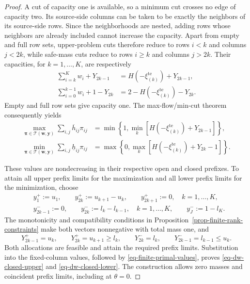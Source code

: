 \begin{proof}
  A cut of capacity one is available, so a minimum cut crosses no edge of capacity two. Its source-side columns can be taken to be exactly the neighbors of its source-side rows. Since the neighborhoods are nested, adding rows whose neighbors are already included cannot increase the capacity. Apart from empty and full row sets, upper-problem cuts therefore reduce to rows $i<k$ and columns $j<2k$, while safe-mass cuts reduce to rows $i\ge k$ and columns $j>2k$. Their capacities, for $k=1,\ldots,K$, are respectively
  \begin{align*}
    \sum_{i=k}^{K}w_i+Y_{2k-1}
      &=H\left(-\xi_{(k)}^{\mathrm{te}}\right)+Y_{2k-1},\\
    \sum_{i=0}^{k-1}w_i+1-Y_{2k}
      &=2-H\left(-\xi_{(k)}^{\mathrm{te}}\right)-Y_{2k}.
  \end{align*}
  Empty and full row sets give capacity one. The max-flow/min-cut theorem \citep{F.F56} consequently yields
  \begin{align*}
    \max_{\bm\pi\in\mathcal T(\bm w,\bm y)}\sum_{i,j}\overline h_{ij}\pi_{ij}
      &=\min\left\{1,\min_k\left[H\left(-\xi_{(k)}^{\mathrm{te}}\right)+Y_{2k-1}\right]\right\},\\
    \min_{\bm\pi\in\mathcal T(\bm w,\bm y)}\sum_{i,j}\underline h_{ij}\pi_{ij}
      &=\max\left\{0,\max_k\left[H\left(-\xi_{(k)}^{\mathrm{te}}\right)+Y_{2k}-1\right]\right\}.
  \end{align*}

  These values are nondecreasing in their respective open and closed prefixes. To attain all upper prefix limits for the maximization and all lower prefix limits for the minimization, choose
  \begin{align*}
    &y_1^+:=u_1,\qquad y_{2k}^+:=u_{k+1}-u_k,\qquad
      y_{2k+1}^+:=0,\quad k=1,\ldots,K,\\
    &y_{2k-1}^-:=0,\qquad y_{2k}^-:=l_k-l_{k-1},\quad k=1,\ldots,K,
      \qquad y_J^-:=1-l_K.
  \end{align*}
  The monotonicity and compatibility conditions in Proposition~\ref{prop-finite-rank-constraints} make both vectors nonnegative with total mass one, and
  \[
    Y_{2k-1}^+=u_k,\qquad Y_{2k}^+=u_{k+1}\ge l_k,
    \qquad Y_{2k}^-=l_k,\qquad Y_{2k-1}^-=l_{k-1}\le u_k.
  \]
  Both allocations are feasible and attain the required prefix limits. Substitution into the fixed-column values, followed by \eqref{eq-finite-primal-values}, proves \eqref{eq-dw-closed-upper} and \eqref{eq-dw-closed-lower}. The construction allows zero masses and coincident prefix limits, including at $\theta=0$.


\end{proof}
